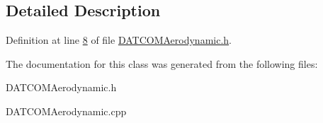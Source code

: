 \subsection{Detailed Description}


Definition at line \hyperlink{_d_a_t_c_o_m_aerodynamic_8h_source_l00008}{8} of file \hyperlink{_d_a_t_c_o_m_aerodynamic_8h_source}{D\+A\+T\+C\+O\+M\+Aerodynamic.\+h}.



The documentation for this class was generated from the following files\+:\begin{DoxyCompactItemize}
\item 
D\+A\+T\+C\+O\+M\+Aerodynamic.\+h\item 
D\+A\+T\+C\+O\+M\+Aerodynamic.\+cpp\end{DoxyCompactItemize}
